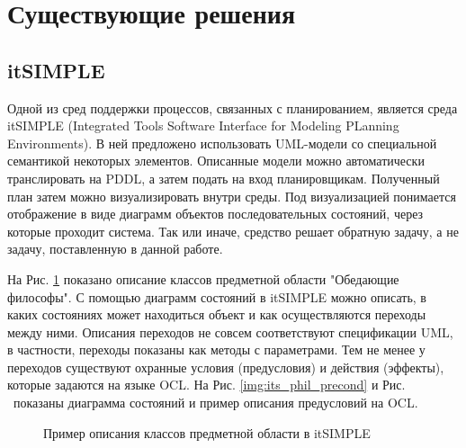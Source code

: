 \documentclass[a4paper,14pt]{extreport}
\begin{document}
   
\section*{Существующие решения}
    
\subsection*{itSIMPLE}
    Одной из сред поддержки процессов, связанных с планированием, является среда itSIMPLE \cite{itsimple} (Integrated Tools Software Interface for Modeling PLanning Environments).
 В ней предложено использовать UML-модели со специальной семантикой некоторых элементов.
 Описанные модели можно автоматически транслировать на PDDL, а затем подать на вход планировщикам.
 Полученный план затем можно визуализировать внутри среды.
 Под визуализацией понимается отображение в виде диаграмм объектов последовательных состояний, через которые проходит система.
 Так или иначе, средство решает обратную задачу, а не задачу, поставленную в данной работе.
    
    На Рис. \ref{img:its_phil_domain} показано описание классов предметной области  "Обедающие философы".
 С помощью диаграмм состояний в itSIMPLE можно описать, в каких состояниях может находиться объект и как осуществляются переходы между ними.
 Описания переходов не совсем соответствуют спецификации UML, в частности, переходы показаны как методы с параметрами.
 Тем не менее у переходов существуют охранные условия (предусловия) и действия (эффекты), которые задаются на языке OCL.
 На Рис. \ref{img:its_phil_precond} и Рис. \ показаны диаграмма состояний и пример описания предусловий на OCL.

    
    \begin{figure}[h]
        \caption{Пример описания классов предметной области в itSIMPLE}
        \label{img:its_phil_domain}

    \end{figure}
    
\end{document}
